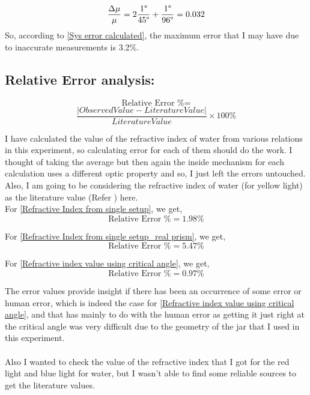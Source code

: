 \documentclass[twocolumn,11pt]{article}
\begin{document}
\begin{equation}
    \label{Sys error calculated}
    \frac{\Delta \mu}{\mu} = 2 \frac{1\degree}{45\degree} + \frac{1 \degree}{96 \degree} = 0.032
\end{equation}
 So, according to \eqref{Sys error calculated}, the maximum error that I may have due to inaccurate measurements is 3.2\%.



\subsection{Relative Error analysis:}

$$\text{Relative Error \%} =$$
\begin{equation}
\label{Relative_Error}
\frac{|Observed Value-Literature Value|}{Literature Value} \times 100 \%
\end{equation}

I have calculated the value of the refractive index of water from various relations in this experiment, so calculating error for each of them should do the work. I thought of taking the average but then again the inside mechanism for each calculation uses a different optic property and so, I just left the errors untouched.
Also, I am going to be considering the refractive index of water (for yellow light) as the literature value (Refer \cite{refractive_index_water}) here.\\
For \eqref{Refractive Index from single setup}, we get,
$$\text{Relative Error \%}= 1.98\% $$

For \eqref{Refractive Index from single setup_real prism}, we get,
$$\text{Relative Error \%}= 5.47\% $$

For \eqref{Refractive index value using critical angle}, we get,
$$\text{Relative Error \%}= 0.97\%$$

The error values provide insight if there has been an occurrence of some error or human error, which is indeed the case for \eqref{Refractive index value using critical angle}, and that has mainly to do with the human error as getting it just right at the critical angle was very difficult due to the geometry of the jar that I used in this experiment. 
\\
\\ Also I wanted to check the value of the refractive index that I got for the red light and blue light for water, but I wasn't able to find some reliable sources to get the literature values. 
\end{document}
